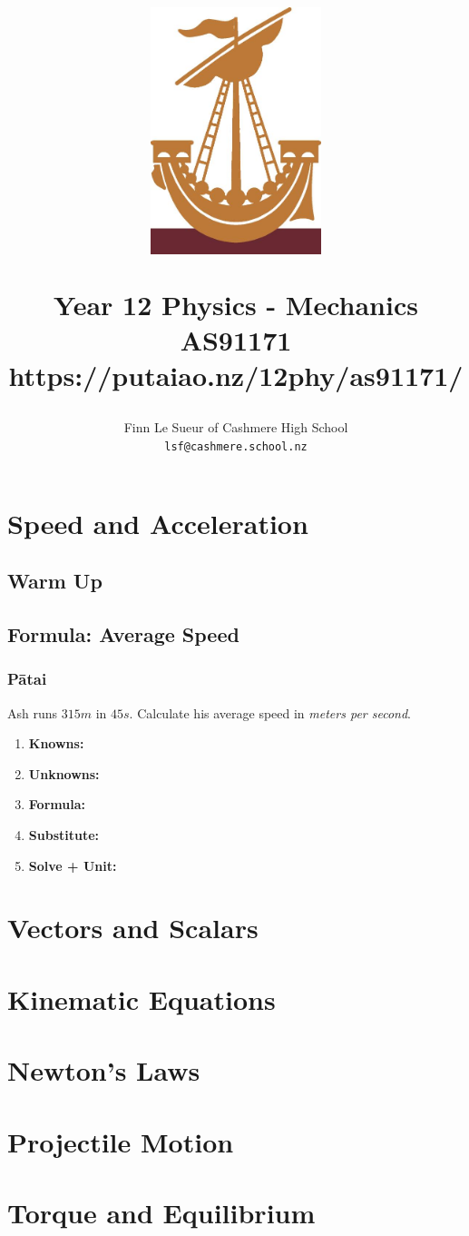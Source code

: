 \documentclass{report}
\title{
    \centerline{\includegraphics[width=50mm]{lymphad.jpg}}
    \vspace{0.5cm}
    Year 12 Physics - Mechanics\\
    \vspace{0.5cm}
    \large AS91171 \\ https://putaiao.nz/12phy/as91171/\\}
\author{Finn Le Sueur of Cashmere High School\\ \texttt{lsf@cashmere.school.nz}}
\date{\the\year{}
}
\newcommand\kufss{
	\begin{enumerate}[itemsep=15pt,label=,leftmargin=0.5cm]
		\item \textbf{Knowns:}
		\item \textbf{Unknowns:}
		\item \textbf{Formula:}
		\item \textbf{Substitute:}
		\item \textbf{Solve + Unit:}
	\end{enumerate}
}
\begin{document}
\maketitle

\newpage

\setcounter{tocdepth}{1}
\tableofcontents

\newpage
\chapter{Speed and Acceleration}

\section{Warm Up}

\section{Formula: Average Speed}

\subsection{Pātai}

Ash runs $315m$ in $45s$. Calculate his average speed in \textit{meters per second}.

\kufss

\newpage
\chapter{Vectors and Scalars}

\newpage
\chapter{Kinematic Equations}

\newpage
\chapter{Newton's Laws}

\newpage
\chapter{Projectile Motion}

\newpage
\chapter{Torque and Equilibrium}
\end{document}
